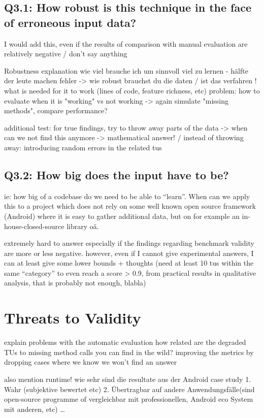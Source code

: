 \subsection{Q3.1: How robust is this technique in the face of erroneous input data?}
I would add this, even if the results of comparison with manual evaluation are relatively negative / don't say anything

Robustness explanation
    wie viel brauche ich um sinnvoll viel zu lernen - hälfte der leute machen fehler -> wie robust brauchst du die daten / ist das verfahren !
    what is needed for it to work (lines of code, feature richness, etc) 
    problem: how to evaluate when it is "working" vs not working -> again simulate "missing methods", compare performance?

additional test:
	for true findings, try to throw away parts of the data -> when can we not find this anymore -> mathematical answer!
    / instead of throwing away: introducing random errors in the related tus

\subsection{Q3.2: How big does the input have to be?}
ie: how big of a codebase do we need to be able to ``learn''. When can we apply this to a project which does not rely on some well known open source framework (Android) where it is easy to gather additional data, but on for example an in-house-closed-source library oä.

extremely hard to answer especially if the findings regarding benchmark validity are more or less negative.
however, even if I cannot give experimental answers, I can at least give some lower bounds + thoughts
(need at least 10 tus within the same ``category'' to even reach a score > 0.9, from practical results in qualitative analysis, that is probably not enough, blabla)

\section{Threats to Validity}

explain problems with the automatic evaluation
how related are the degraded TUs to missing method calls you can find in the wild?
improving the metrics by dropping cases where we know we won't find an answer

also mention runtime!
wie sehr sind die resultate aus der Android case study 1. Wahr (subjektive bewertet etc) 2. Übertragbar auf andere Anwendungsfälle(sind open-source programme of vergleichbar mit professionellen, Android eco System mit anderen, etc)
\ldots
